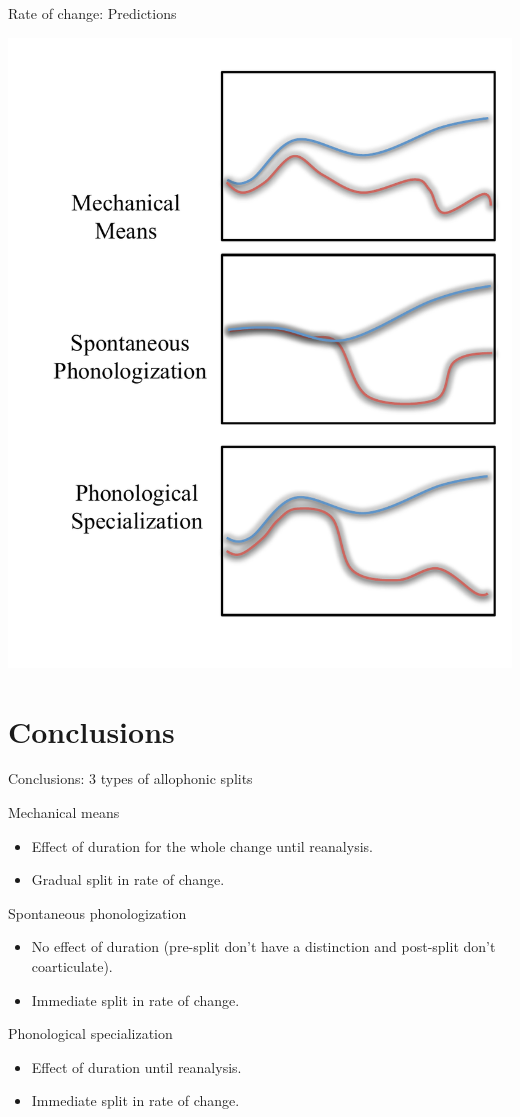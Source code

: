 \documentclass[hyperref={pdfpagelabels=false}]{beamer}
\begin{document}
\begin{frame}{Rate of change: Predictions}
	\begin{center}
	\includegraphics[width=.5\textwidth]{rocpred.pdf}
	\end{center}
\end{frame}


\section{Conclusions}

\begin{frame}{Conclusions: 3 types of allophonic splits}
	\begin{block}{Mechanical means}
		\begin{itemize}
			\item Effect of duration for the whole change until reanalysis.
			\item Gradual split in rate of change. \pause
		\end{itemize}
	\end{block}
	
	\begin{block}{Spontaneous phonologization}
		\begin{itemize}
			\item No effect of duration (pre-split don't have a distinction and post-split don't coarticulate).
			\item Immediate split in rate of change. \pause
		\end{itemize}
	\end{block}
	
	\begin{block}{Phonological specialization}
		\begin{itemize}
			\item Effect of duration until reanalysis.
			\item Immediate split in rate of change.
		\end{itemize}
	\end{block}
\end{frame}
\end{document}
